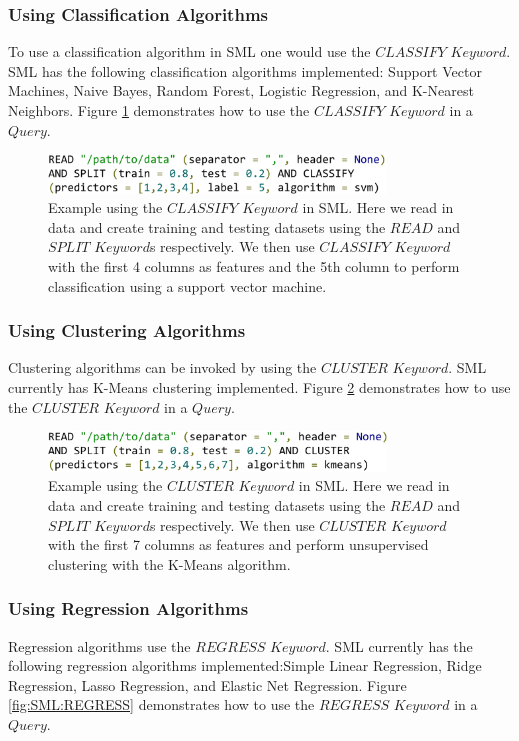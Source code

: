 \documentclass[jair,twoside,11pt,theapa]{article}
\begin{document}
\subsubsection{Using Classification Algorithms}
To use a classification algorithm in SML one would use the \(CLASSIFY\) \(Keyword\). SML has the following classification algorithms implemented: Support Vector Machines, Naive Bayes, Random Forest, Logistic Regression, and K-Nearest Neighbors. Figure \ref{fig:SML:CLASSIFY} demonstrates how to use the \(CLASSIFY\) \(Keyword\) in a \(Query\). 

\begin{figure}
\includegraphics[width=0.8\textwidth]{figs/CLASSIFY.png}
\centering
\caption{Example using the \(CLASSIFY\) \(Keyword\) in SML. Here we read in data and create training and testing datasets using the \(READ\) and \(SPLIT\) \(Keyword\)s respectively. We then use \(CLASSIFY\) \(Keyword\) with the first 4 columns as features and the 5th column to perform classification using a support vector machine.}
\label{fig:SML:CLASSIFY}
\end{figure}

\subsubsection{Using Clustering Algorithms}
Clustering algorithms can be invoked by using the \(CLUSTER\) \(Keyword\). SML currently has K-Means clustering implemented. Figure \ref{fig:SML:CLUSTER} demonstrates how to use the \(CLUSTER\) \(Keyword\) in a \(Query\).

\begin{figure}
\includegraphics[width=0.8\textwidth]{figs/CLUSTER.png}
\centering
\caption{Example using the \(CLUSTER\) \(Keyword\) in SML. Here we read in data and create training and testing datasets using the \(READ\) and \(SPLIT\) \(Keyword\)s respectively. We then use \(CLUSTER\) \(Keyword\) with the first 7 columns as features and perform unsupervised clustering with the K-Means algorithm.}
\label{fig:SML:CLUSTER}
\end{figure}

\subsubsection{Using Regression Algorithms}
Regression algorithms use the \(REGRESS\) \(Keyword\). SML currently has the following regression algorithms implemented:Simple Linear Regression, Ridge Regression, Lasso Regression, and Elastic Net Regression. Figure \ref{fig:SML:REGRESS} demonstrates how to use the \(REGRESS\) \(Keyword\) in a \(Query\).
\end{document}
